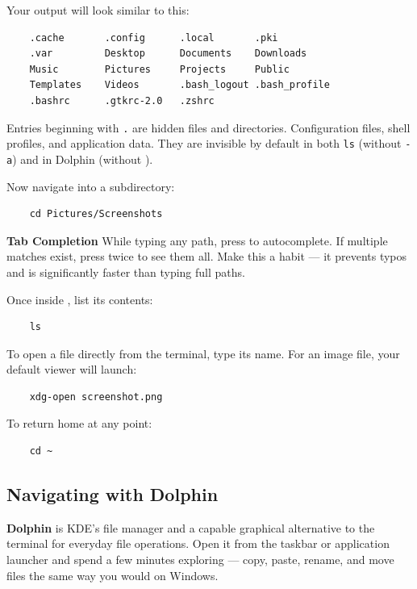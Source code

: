 \documentclass{article}
\newcommand{\code}[1]{\colorbox{codebg}{\texttt{#1}}}
\begin{document}
Your output will look similar to this:

\begin{verbatim}
	.cache       .config      .local       .pki
	.var         Desktop      Documents    Downloads
	Music        Pictures     Projects     Public
	Templates    Videos       .bash_logout .bash_profile
	.bashrc      .gtkrc-2.0   .zshrc
\end{verbatim}

\noindent Entries beginning with \code{.} are hidden files and directories. Configuration
files, shell profiles, and application data. They are invisible by default in both
\code{ls} (without \code{-a}) and in Dolphin (without ).

Now navigate into a subdirectory:

\begin{verbatim}
	cd Pictures/Screenshots
\end{verbatim}

\begin{callout}{\textbf{Tab Completion}}
	While typing any path, press  to autocomplete. If multiple matches exist,
	press  twice to see them all. Make this a habit --- it prevents typos and
	is significantly faster than typing full paths.
\end{callout}

Once inside , list its contents:

\begin{verbatim}
	ls
\end{verbatim}

To open a file directly from the terminal, type its name. For an image file, your
default viewer will launch:

\begin{verbatim}
	xdg-open screenshot.png
\end{verbatim}

To return home at any point:

\begin{verbatim}
	cd ~
\end{verbatim}

\subsection{Navigating with Dolphin}

\textbf{Dolphin} is KDE's file manager and a capable graphical alternative to the
terminal for everyday file operations. Open it from the taskbar or application
launcher and spend a few minutes exploring --- copy, paste, rename, and move files
the same way you would on Windows.
\end{document}
